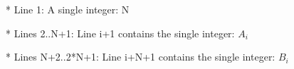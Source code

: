 * Line 1: A single integer: N  

   * Lines 2..N+1: Line i+1 contains the single integer: $A_{i}$

   * Lines N+2..2*N+1: Line i+N+1 contains the single integer: $B_{i}$